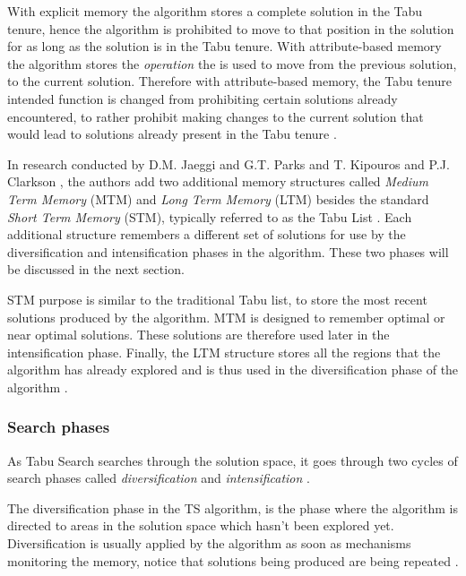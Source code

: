 With explicit memory the algorithm stores a complete solution in the Tabu tenure, hence the algorithm is prohibited to move to that position in the solution for as long as the solution is in the Tabu tenure\cite{TabuBiddingStrats,TabuFormGames}. With attribute-based memory the algorithm stores the \emph{operation} the is used to move from the previous solution, to the current solution\cite{TabuBiddingStrats,TabuFormGames}. Therefore with attribute-based memory, the Tabu tenure intended function is changed from prohibiting certain solutions already encountered, to rather prohibit making changes to the current solution that would lead to solutions already present in the Tabu tenure \cite{TabuBiddingStrats,TabuFormGames}.

In research conducted by D.M. Jaeggi and G.T. Parks and T. Kipouros and P.J. Clarkson \cite{MultiObjTabu}, the authors add two additional memory structures called \emph{Medium Term Memory} (MTM) and \emph{Long Term Memory} (LTM) besides the standard \emph{Short Term Memory} (STM), typically referred to as the Tabu List \cite{MultiObjTabu} . Each additional structure remembers a different set of solutions for use by the diversification and intensification phases in the algorithm. These two phases will be discussed in the next section.

STM purpose is similar to the traditional Tabu list, to store the most recent solutions produced by the algorithm. MTM is designed to remember optimal or near optimal solutions. These solutions are therefore used later in the intensification phase. Finally, the LTM structure stores all the regions that the algorithm has already explored and is thus used in the diversification phase of the algorithm \cite{MultiObjTabu}.

\subsubsection{Search phases}
As Tabu Search searches through the solution space, it goes through two cycles of search phases called \emph{diversification} and \emph{intensification} \cite{TabuParameterization,TabuCrewSchedulingProblem,NonlinearGlobalTabu,SelfControllingReactiveTabu}.

The diversification phase in the TS algorithm, is the phase where the algorithm is directed to areas in the solution space which hasn't been explored yet. Diversification is usually applied by the algorithm as soon as mechanisms monitoring the memory, notice that solutions being produced are being repeated \cite{ReactiveTabuVHR,SelfControllingReactiveTabu}. 

